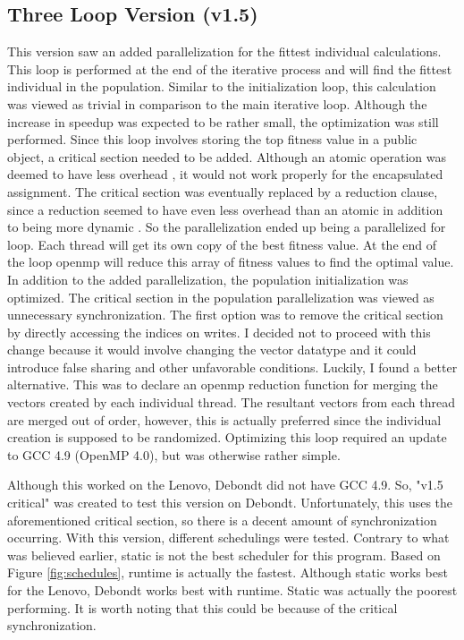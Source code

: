 \documentclass[10pt,letterpaper]{article}
\begin{document}
\newpage
\subsection{Three Loop Version (v1.5)}
This version saw an added parallelization for the fittest individual calculations. This loop is performed at the end of the iterative process and will find the fittest individual in the population. Similar to the initialization loop, this calculation was viewed as trivial in comparison to the main iterative loop. Although the increase in speedup was expected to be rather small, the optimization was still performed. Since this loop involves storing the top fitness value in a public object, a critical section needed to be added. Although an atomic operation was deemed to have less overhead \cite{atomicoverhead}, it would not work properly for the encapsulated assignment. The critical section was eventually replaced by a reduction clause, since a reduction seemed to have even less overhead than an atomic in addition to being more dynamic \cite{suss2008common}. So the parallelization ended up being a parallelized for loop. Each thread will get its own copy of the best fitness value. At the end of the loop openmp will reduce this array of fitness values to find the optimal value.
In addition to the added parallelization, the population initialization was optimized. The critical section in the population parallelization was viewed as unnecessary synchronization. The first option was to remove the critical section by directly accessing the indices on writes. I decided not to proceed with this change because it would involve changing the vector datatype and it could introduce false sharing and other unfavorable conditions. Luckily, I found a better alternative. This was to declare an openmp reduction function for merging the vectors created by each individual thread. The resultant vectors from each thread are merged out of order, however, this is actually preferred since the individual creation is supposed to be randomized. Optimizing this loop required an update to GCC 4.9 (OpenMP 4.0), but was otherwise rather simple.

Although this worked on the Lenovo, Debondt did not have GCC 4.9. So, "v1.5 critical" was created to test this version on Debondt. Unfortunately, this uses the aforementioned critical section, so there is a decent amount of synchronization occurring. With this version, different schedulings were tested. Contrary to what was believed earlier, static is not the best scheduler for this program. Based on Figure \ref{fig:schedules}, runtime is actually the fastest. Although static works best for the Lenovo, Debondt works best with runtime. Static was actually the poorest performing. It is worth noting that this could be because of the critical synchronization.
\end{document}
